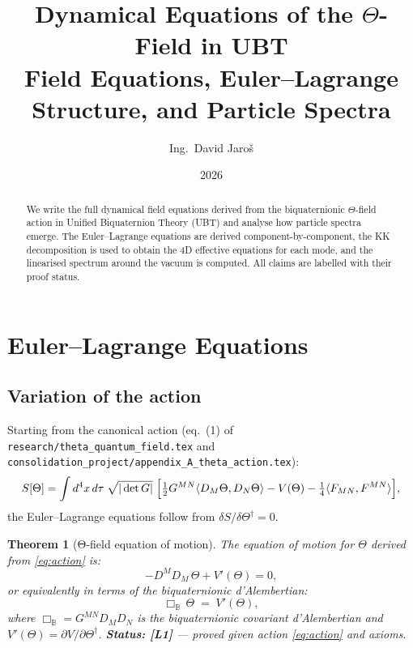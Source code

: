 \documentclass[11pt,a4paper]{article}
\title{Dynamical Equations of the \texorpdfstring{$\Theta$}{Theta}-Field in UBT\\
\large Field Equations, Euler--Lagrange Structure, and Particle Spectra}
\author{Ing.\ David Jaroš}
\date{2026}
\newtheorem{theorem}{Theorem}
\begin{document}
\maketitle

\begin{abstract}
We write the full dynamical field equations derived from the biquaternionic
$\Theta$-field action in Unified Biquaternion Theory (UBT) and analyse how
particle spectra emerge.  The Euler--Lagrange equations are derived
component-by-component, the KK decomposition is used to obtain the 4D
effective equations for each mode, and the linearised spectrum around the
vacuum is computed.  All claims are labelled with their proof status.
\end{abstract}

\tableofcontents

\section{Euler--Lagrange Equations}
\label{sec:el}

\subsection{Variation of the action}

Starting from the canonical action (eq.\ (1) of
\texttt{research/theta\_quantum\_field.tex} and
\texttt{consolidation\_project/appendix\_A\_theta\_action.tex}):
\begin{equation}
\label{eq:action}
  S[\Theta]
  = \int d^4x\, d\tau\;\sqrt{|\det G|}\;
    \Bigl[\tfrac{1}{2}G^{MN}\langle D_M\Theta, D_N\Theta\rangle
          - V(\Theta)
          - \tfrac{1}{4}\langle F_{MN}, F^{MN}\rangle\Bigr],
\end{equation}
the Euler--Lagrange equations follow from $\delta S / \delta\Theta^\dagger = 0$.

\begin{theorem}[Θ-field equation of motion]\label{thm:eom}
  The equation of motion for $\Theta$ derived from \eqref{eq:action} is:
  \begin{equation}
  \label{eq:eom}
    -D^M D_M\,\Theta + V'(\Theta) = 0,
  \end{equation}
  or equivalently in terms of the biquaternionic d'Alembertian:
  \begin{equation}
  \label{eq:box}
    \Box_{\mathbb{B}}\,\Theta \;=\; V'(\Theta),
  \end{equation}
  where $\Box_{\mathbb{B}} = G^{MN}D_M D_N$ is the biquaternionic
  covariant d'Alembertian and $V'(\Theta) = \partial V/\partial\Theta^\dagger$.
  \textbf{Status: [L1]} — proved given action \eqref{eq:action} and axioms.
\end{theorem}
\end{document}
